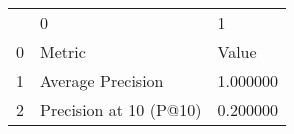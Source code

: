 \begin{tabular}{lll}
 & 0 & 1 \\
0 & Metric & Value \\
1 & Average Precision & 1.000000 \\
2 & Precision at 10 (P@10) & 0.200000 \\
\end{tabular}
